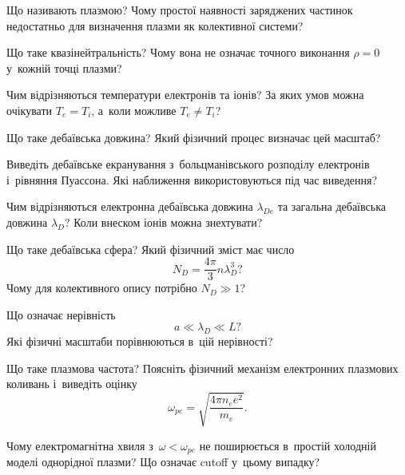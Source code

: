 \begin{Questions}
	\begin{quizlist}
		\item Що називають плазмою? Чому простої наявності заряджених частинок недостатньо для визначення плазми як колективної системи?

		\item Що таке квазінейтральність? Чому вона не означає точного виконання $\rho=0$ у~кожній точці плазми?

		\item Чим відрізняються температури електронів та іонів? За яких умов можна очікувати $T_e=T_i$, а~коли можливе $T_e\ne T_i$?

		\item Що таке дебаївська довжина? Який фізичний процес визначає цей масштаб?

		\item Виведіть дебаївське екранування з~больцманівського розподілу електронів і~рівняння Пуассона. Які наближення використовуються під час виведення?

		\item Чим відрізняються електронна дебаївська довжина $\lambda_{De}$ та загальна дебаївська довжина $\lambda_D$? Коли внеском іонів можна знехтувати?

		\item Що таке дебаївська сфера? Який фізичний зміст має число
		\begin{equation*}
			N_D=\frac{4\pi}{3}n\lambda_D^3?
		\end{equation*}
		Чому для колективного опису потрібно $N_D\gg1$?

		\item Що означає нерівність
		\begin{equation*}
			a\ll\lambda_D\ll L?
		\end{equation*}
		Які фізичні масштаби порівнюються в~цій нерівності?

		\item Що таке плазмова частота? Поясніть фізичний механізм електронних плазмових коливань і~виведіть оцінку
		\begin{equation*}
			\omega_{pe}
			=\sqrt{\frac{4\pi n_e e^2}{m_e}}.
		\end{equation*}

		\item Чому електромагнітна хвиля з~$\omega<\omega_{pe}$ не поширюється в~простій холодній моделі однорідної плазми? Що означає cutoff у~цьому випадку?


\end{quizlist}
\end{Questions}
